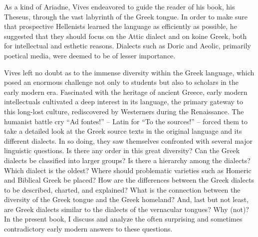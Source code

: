 As a kind of Ariadne, Vives endeavored to guide the reader of his book, his Theseus, through the vast labyrinth of the Greek tongue. In order to make sure that prospective Hellenists learned the language as efficiently as possible, he suggested that they should focus on the Attic dialect and on koine Greek, both for intellectual and esthetic reasons. Dialects such as Doric and Aeolic, primarily poetical media, were deemed to be of lesser importance.

Vives left no doubt as to the immense diversity within the Greek language, which posed an enormous challenge not only to students but also to scholars in the early modern era. Fascinated with the heritage of ancient Greece, early modern intellectuals cultivated a deep interest in its language, the primary gateway to this long-lost culture, rediscovered by Westerners during the Renaissance. The humanist battle cry “Ad fontes!” – Latin for “To the sources!” – forced them to take a detailed look at the Greek source texts in the original language and its different dialects. In so doing, they saw themselves confronted with several major linguistic questions. Is there any order in this great diversity? Can the Greek dialects be classified into larger groups? Is there a hierarchy among the dialects? Which dialect is the oldest? Where should problematic varieties such as Homeric and Biblical Greek be placed? How are the differences between the Greek dialects to be described, charted, and explained? What is the connection between the diversity of the Greek tongue and the Greek homeland? And, last but not least, are Greek dialects similar to the dialects of the vernacular tongues? Why (not)? In the present book, I discuss and analyze the often surprising and sometimes contradictory early modern answers to these questions.

